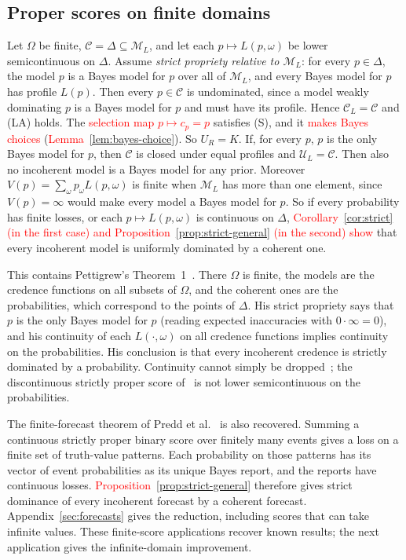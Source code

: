 \documentclass[11pt]{article}
\theoremstyle{definition}
\theoremstyle{remark}
\newcommand{\M}{\mathcal M}
\newcommand{\C}{\mathcal C}
\newcommand{\U}{\mathcal U}
\begin{document}
\subsection{Proper scores on finite domains}\label{sec:proper}
Let $\Omega$ be finite, $\C=\Delta\subseteq\M_L$, and let each $p\mapsto L(p,\omega)$ be lower semicontinuous on $\Delta$. Assume \emph{strict propriety relative to $\M_L$}: for every $p\in\Delta$, the model $p$ is a Bayes model for $p$ over all of $\M_L$, and every Bayes model for $p$ has profile $L(p)$. Then every $p\in\C$ is undominated, since a model weakly dominating $p$ is a Bayes model for $p$ and must have its profile. Hence $\C_L=\C$ and (LA) holds. The \textcolor{red}{selection map $p\mapsto c_p=p$} satisfies (S), and it \textcolor{red}{makes Bayes choices} (\textcolor{red}{Lemma~\ref{lem:bayes-choice}}). So $U_R=K$. If, for every $p$, $p$ is the only Bayes model for $p$, then $\C$ is closed under equal profiles and $\U_L=\C$. Then also no incoherent model is a Bayes model for any prior. Moreover $V(p)=\sum_\omega p_\omega L(p,\omega)$ is finite when $\M_L$ has more than one element, since $V(p)=\infty$ would make every model a Bayes model for $p$. So if every probability has finite losses, or each $p\mapsto L(p,\omega)$ is continuous on $\Delta$, \textcolor{red}{Corollary~\ref{cor:strict} (in the first case) and Proposition~\ref{prop:strict-general} (in the second) show} that every incoherent model is uniformly dominated by a coherent one.

This contains Pettigrew's Theorem~1~\cite{Pettigrew}. There $\Omega$ is finite, the models are the credence functions on all subsets of $\Omega$, and the coherent ones are the probabilities, which correspond to the points of $\Delta$. His strict propriety says that $p$ is the only Bayes model for $p$ (reading expected inaccuracies with $0\cdot\infty=0$), and his continuity of each $L(\cdot,\omega)$ on all credence functions implies continuity on the probabilities. His conclusion is that every incoherent credence is strictly dominated by a probability. Continuity cannot simply be dropped~\cite{SSK09}; the discontinuous strictly proper score of~\cite[Example~4]{SSK09} is not lower semicontinuous on the probabilities.

The finite-forecast theorem of Predd et al.~\cite[Theorem~1]{Predd} is also recovered. Summing a continuous strictly proper binary score over finitely many events gives a loss on a finite set of truth-value patterns. Each probability on those patterns has its vector of event probabilities as its unique Bayes report, and the reports have continuous losses. \textcolor{red}{Proposition~\ref{prop:strict-general}} therefore gives strict dominance of every incoherent forecast by a coherent forecast. Appendix~\ref{sec:forecasts} gives the reduction, including scores that can take infinite values. These finite-score applications recover known results; the next application gives the infinite-domain improvement.
\end{document}
